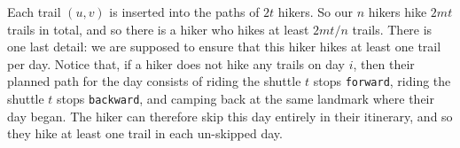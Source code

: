 \documentclass{theoretics}
\newcommand{\forward}{\texttt{forward}}
\newcommand{\backward}{\texttt{backward}}
\begin{document}
\begin{solution}
Each trail $(u, v)$ is inserted into the paths of $2t$ hikers.
So our $n$ hikers hike $2mt$ trails in total, and so there is a hiker who hikes at least $2mt/n$ trails.
There is one last detail: we are supposed to ensure that this hiker hikes at least one trail per day.
Notice that, if a hiker does not hike any trails on day $i$, then their planned path for the day consists of riding the shuttle $t$ stops \forward{}, riding the shuttle $t$ stops \backward{}, and camping back at the same landmark where their day began.
The hiker can therefore skip this day entirely in their itinerary, and so they hike at least one trail in each un-skipped day.
\end{solution}




\end{document}
